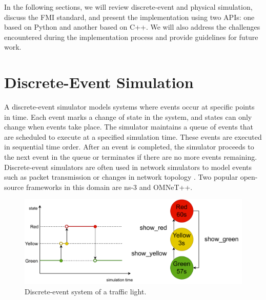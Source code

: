 \documentclass[conference]{IEEEtran}
\def\ns3{ns-3}
\begin{document}
In the following sections, we will review discrete-event and physical simulation, discuss the FMI standard, and present the implementation using two APIs: one based on Python and another based on C++. We will also address the challenges encountered during the implementation process and provide guidelines for future work.

\section{Discrete-Event Simulation}

A discrete-event simulator models systems where events occur at specific points in time.
Each event marks a change of state in the system, and states can only change when events take place. 
The simulator maintains a queue of events that are scheduled to execute at a specified simulation time.
These events are executed in sequential time order.
After an event is completed, the simulator proceeds to the next event in the queue or terminates if there are no more events remaining.
Discrete-event simulators are often used in network simulators to model events such as
packet transmission or changes in network topology \cite{riley2010ns}.
Two popular open-source frameworks in this domain are \ns3 and OMNeT++.

\begin{figure}[htbp]
  \centering
  \includegraphics[width=\linewidth]{images/traffic-light.drawio.pdf}
  \caption{Discrete-event system of a traffic light.}
  \label{traffic-light}
\end{figure}
\end{document}
